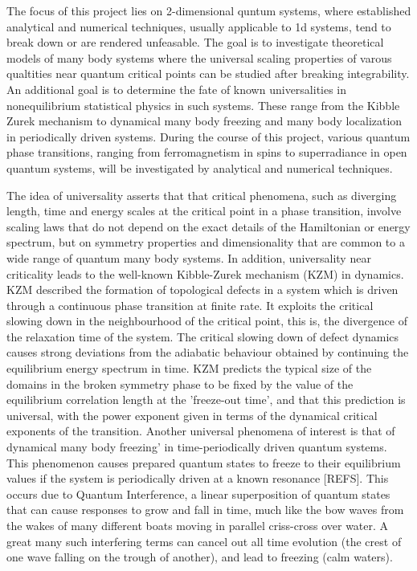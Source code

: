 \documentclass[a4paper,11pt,color]{article}
\begin{document}
The focus of this project lies on 2-dimensional quntum systems, where established analytical and numerical techniques, usually applicable to 1d systems, tend to break down or are rendered unfeasable. The goal is to investigate theoretical models of many body systems where the universal scaling properties of varous qualtities near quantum critical points can be studied after breaking integrability.  An additional goal is to determine the fate of known universalities in nonequilibrium statistical physics in such systems. These range from the Kibble Zurek mechanism to dynamical many body freezing and many body localization in periodically driven systems. During the course of this project, various quantum phase transitions, ranging from ferromagnetism in spins to superradiance in open quantum systems, will be investigated by analytical and numerical techniques.

The idea of universality asserts that that critical phenomena, such as diverging length, time and energy  scales at the critical point in a phase transition, involve scaling laws that do not depend on the exact details of the Hamiltonian or energy spectrum, but on symmetry properties and dimensionality that are common to a wide range of quantum many body systems. In addition, universality near criticality leads  to the well-known Kibble-Zurek mechanism (KZM) in dynamics. KZM described the formation of topological defects in a system which is driven through a continuous phase transition at finite rate. It exploits the critical slowing down in the neighbourhood of the critical point, this is, the divergence of the relaxation time of the system. The critical slowing down of defect dynamics causes strong deviations from the adiabatic behaviour obtained by continuing the equilibrium energy spectrum in time. KZM predicts the typical size of the domains in the broken symmetry phase to be fixed by the value of the equilibrium correlation length at the 'freeze-out time', and that this prediction is universal, with the power exponent given in terms of the dynamical critical exponents of the transition. Another universal phenomena of interest is that of dynamical many body freezing' in time-periodically driven quantum systems. This phenomenon causes prepared quantum states to freeze to their equilibrium values if the system is periodically driven at a known resonance [REFS]. This occurs due to Quantum Interference, a linear superposition of quantum states that can cause responses to grow and fall in time, much like the bow waves from the wakes of many different boats moving in parallel criss-cross over water. A great many such interfering terms can cancel out all time evolution (the crest of one wave falling on the trough of another), and lead to freezing (calm waters). 
\end{document}

